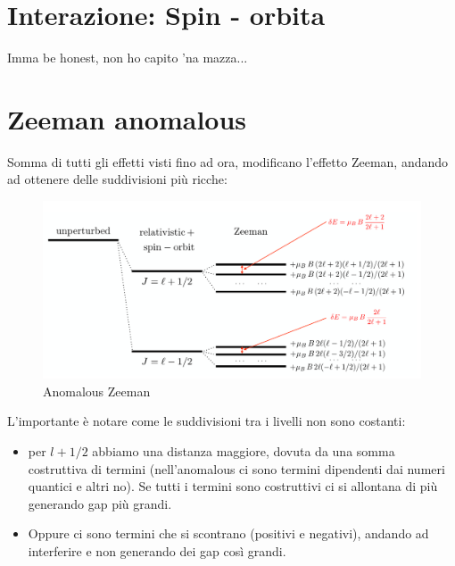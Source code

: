 \section{Interazione: Spin - orbita}
Imma be honest, non ho capito 'na mazza...

\section{Zeeman anomalous}
Somma di tutti gli effetti visti fino ad ora, modificano l'effetto Zeeman, andando ad ottenere delle suddivisioni più ricche:

\begin{figure}[ht]
	\centering
	\includegraphics[width=1\textwidth]{../images/Screenshot 2025-02-21 192037.png}
	\caption{Anomalous Zeeman}
	\label{fig:anomalous_zeeman}
\end{figure}

L'importante è notare come le suddivisioni tra i livelli non sono costanti:
\begin{itemize}
	\item per $l+1/2$ abbiamo una distanza maggiore, dovuta da una somma costruttiva di termini (nell'anomalous ci sono termini dipendenti dai numeri quantici e altri no). Se tutti i termini sono costruttivi ci si allontana di più generando gap più grandi.
	\item Oppure ci sono termini che si scontrano (positivi e negativi), andando ad interferire e non generando dei gap così grandi.
\end{itemize}

